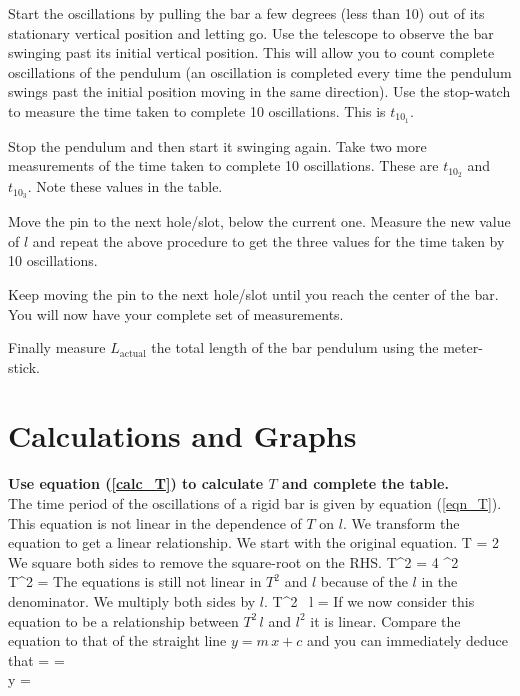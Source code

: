 \documentclass{article}
\begin{document}
      Start the oscillations by pulling the bar a few degrees (less than 10) out of its stationary vertical position and letting go. Use the telescope to observe the bar swinging past its initial vertical position. This will allow you to count complete oscillations of the pendulum (an oscillation is completed every time the pendulum swings past the initial position moving in the same direction). Use the stop-watch to measure the time taken to complete 10 oscillations. This is $t_{10_1}$.

      Stop the pendulum and then start it swinging again. Take two more measurements of the time taken to complete 10 oscillations. These are $t_{10_2}$ and $t_{10_3}$. Note these values in the table.

      Move the pin to the next hole/slot, below the current one. Measure the new value of $l$ and repeat the above procedure to get the three values for the time taken by 10 oscillations.

      Keep moving the pin to the next hole/slot until you reach the center of the bar. You will now have your complete set of measurements.

      Finally measure $L_\text{actual}$ the total length of the bar pendulum using the meter-stick.


   \section*{Calculations and Graphs}

      \textbf{Use equation (\ref{calc_T}) to calculate $T$ and complete the table.}\\

      The time period of the oscillations of a rigid bar is given by equation (\ref{eqn_T}). This equation is not linear in the dependence of $T$ on $l$. We transform the equation to get a linear relationship. We start with the original equation.
%
      \beqn
         T = 2 \pi {}
      \eeqn
      We square both sides to remove the square-root on the RHS.
      \beqsn
         T^2 = 4 \pi^2  \\[0.25\baselineskip]
         \imply T^2 =  
      \eeqsn
      The equations is still not linear in $T^2$ and $l$ because of the $l$ in the denominator. We multiply both sides by $l$.
      \beq
         T^2 \, l =  
      \eeq
      If we now consider this equation to be a relationship between $T^2 \, l$ and $l^2$ it is linear. Compare the equation to that of the straight line $y = m \, x + c$ and you can immediately deduce that
      \beqc \label{graph}
          =  = \\[0.5\baselineskip]
         y = 
      \eeqc
\end{document}
